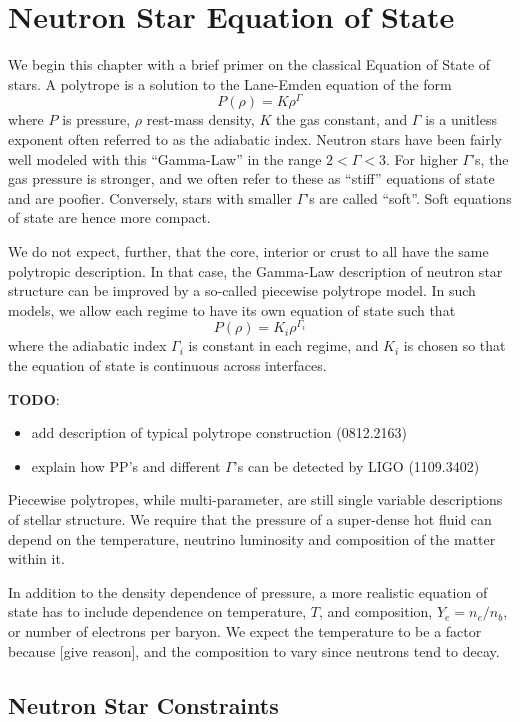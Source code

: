 \chapter{Neutron Star Equation of State}
\label{chap:chapter-2}

We begin this chapter with a brief primer on the classical Equation of State of stars.
A polytrope is a solution to the Lane-Emden equation of the form
$$P(\rho) = K \rho^\Gamma$$
where $P$ is pressure, $\rho$ rest-mass density, $K$ the gas constant, and $\Gamma$ is a unitless exponent often referred to as the adiabatic index.
Neutron stars have been fairly well modeled with this ``Gamma-Law'' in the range $2 < \Gamma < 3$.
For higher $\Gamma$'s, the gas pressure is stronger, and we often refer to these as ``stiff'' equations of state and are poofier.
Conversely, stars with smaller $\Gamma$'s are called ``soft''.  Soft equations of state are hence more compact.

We do not expect, further, that the core, interior or crust to all have the same polytropic description.
In that case, the Gamma-Law description of neutron star structure can be improved by a so-called piecewise polytrope model.
In such models, we allow each regime to have its own equation of state such that 
$$P(\rho) = K_i \rho^{\Gamma_i}$$
where the adiabatic index $\Gamma_i$ is constant in each regime, and $K_i$ is chosen so that the equation of state is continuous across interfaces.

\textbf{TODO}: 
\begin{itemize}
	\item add description of typical polytrope construction  (0812.2163)
	\item explain how PP's and different $\Gamma$'s can be detected by LIGO (1109.3402)
\end{itemize}

Piecewise polytropes, while multi-parameter, are still single variable descriptions of stellar structure.  We require that the pressure of a super-dense hot fluid can depend on the temperature, neutrino luminosity and composition of the matter within it.

In addition to the density dependence of pressure, a more realistic equation of state has to include dependence on temperature, $T$, and composition, $Y_e = n_e / n_b$, or number of electrons per baryon.  We expect the temperature to be a factor because [give reason], and the composition to vary since neutrons tend to decay. 


\section{Neutron Star Constraints}

